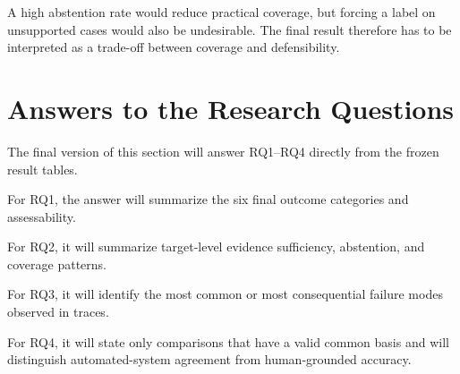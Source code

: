 A high abstention rate would reduce practical coverage, but forcing a label on unsupported cases would also be undesirable. The final result therefore has to be interpreted as a trade-off between coverage and defensibility.

\section{Answers to the Research Questions}

The final version of this section will answer RQ1--RQ4 directly from the frozen result tables.

For RQ1, the answer will summarize the six final outcome categories and assessability.

For RQ2, it will summarize target-level evidence sufficiency, abstention, and coverage patterns.

For RQ3, it will identify the most common or most consequential failure modes observed in traces.

For RQ4, it will state only comparisons that have a valid common basis and will distinguish automated-system agreement from human-grounded accuracy.

